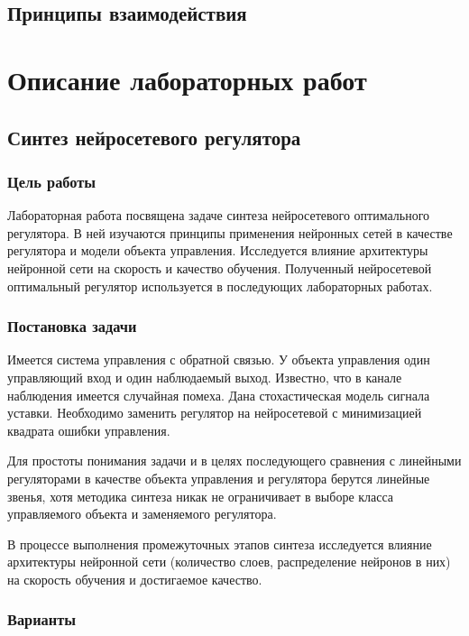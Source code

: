 \subsection{Принципы взаимодействия}


\section{Описание лабораторных работ}

\subsection{Синтез нейросетевого регулятора}

\subsubsection{Цель работы}

Лабораторная работа посвящена задаче синтеза нейросетевого
оптимального регулятора.  В ней изучаются принципы применения
нейронных сетей в качестве регулятора и модели объекта управления.
Исследуется влияние архитектуры нейронной сети на скорость и качество
обучения.  Полученный нейросетевой оптимальный регулятор используется
в последующих лабораторных работах.

\subsubsection{Постановка задачи}

Имеется система управления с обратной связью.  У объекта управления
один управляющий вход и один наблюдаемый выход.  Известно, что в
канале наблюдения имеется случайная помеха.  Дана стохастическая
модель сигнала уставки.  Необходимо заменить регулятор на нейросетевой
с минимизацией квадрата ошибки управления.

Для простоты понимания задачи и в целях последующего сравнения с
линейными регуляторами в качестве объекта управления и регулятора
берутся линейные звенья, хотя методика синтеза никак не ограничивает в
выборе класса управляемого объекта и заменяемого регулятора.

В процессе выполнения промежуточных этапов синтеза исследуется влияние
архитектуры нейронной сети (количество слоев, распределение нейронов в
них) на скорость обучения и достигаемое качество.

\subsubsection{Варианты}

